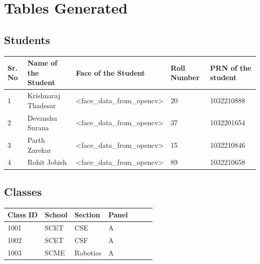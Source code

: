 \documentclass[11pt]{article}
\begin{document}
\section{Tables Generated}

\subsection{Students}

\begin{table}[H]
	\begin{tabular}{|l|l|l|l|l|}
		\hline
		\textbf{Sr. No } & \textbf{Name of the Student } & \textbf{Face of the Student                               } & \textbf{Roll Number} & \textbf{PRN of the student } \\ \hline
		1                & Krishnaraj Thadesar           & \textless{}face\_data\_from\_opencv\textgreater{}           & 20                                   & 1032210888                   \\ \hline
		2                & Devanshu Surana               & \textless{}face\_data\_from\_opencv\textgreater{}           & 37                                   & 1032201654                   \\ \hline
		3                & Parth Zarekar                 & \textless{}face\_data\_from\_opencv\textgreater{}           & 15                                   & 1032210846                   \\ \hline
		4                & Rohit Jobish                  & \textless{}face\_data\_from\_opencv\textgreater{}           & 89                                   & 1032210658                   \\ \hline
	\end{tabular}
\end{table}

\subsection{Classes}

\begin{table}[H]
	\begin{tabular}{|l|l|l|l|l|l|l|}
		\hline
		\textbf{Class ID } & \textbf{School } & \textbf{Section  } & \textbf{Panel } \\ \hline
		1001               & SCET             & CSE                & A               \\ \hline
		1002               & SCET             & CSF                & A               \\ \hline
		1003               & SCME             & Robotics           & A               \\ \hline
	\end{tabular}
\end{table}
\end{document}
